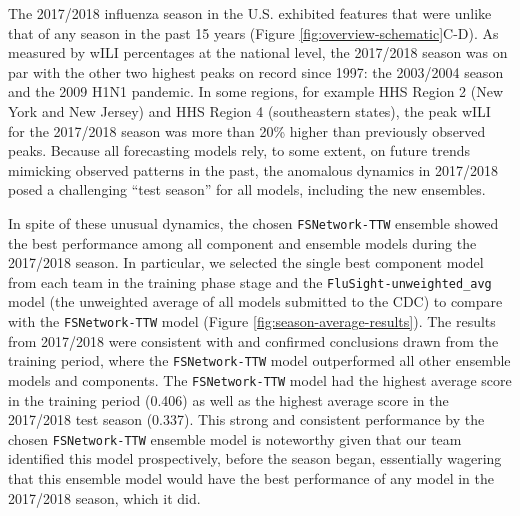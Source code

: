 \documentclass{article}\usepackage[]{graphicx}\usepackage[]{color}
\begin{document}
The 2017/2018 influenza season in the U.S. exhibited features that were unlike that of any season in the past 15 years (Figure \ref{fig:overview-schematic}C-D).
As measured by wILI percentages at the national level, the 2017/2018 season was on par with the other two highest peaks on record since 1997: the 2003/2004 season and the 2009 H1N1 pandemic.
In some regions, for example HHS Region 2 (New York and New Jersey) and HHS Region 4 (southeastern states), the peak wILI for the 2017/2018 season was more than 20\% higher than previously observed peaks.
Because all forecasting models rely, to some extent, on future trends mimicking observed patterns in the past, the anomalous dynamics in 2017/2018 posed a challenging ``test season'' for all models, including the new ensembles.

In spite of these unusual dynamics, the chosen {\tt FSNetwork-TTW} ensemble showed the best performance among all component and ensemble models during the 2017/2018 season.
In particular, we selected the single best component model from each team in the training phase stage and the {\tt FluSight-unweighted\_avg} model (the unweighted average of all models submitted to the CDC) to compare with the {\tt FSNetwork-TTW} model (Figure \ref{fig:season-average-results}).
The results from 2017/2018 were consistent with and confirmed conclusions drawn from the training period, where the {\tt FSNetwork-TTW} model outperformed all other ensemble models and components.
The {\tt FSNetwork-TTW} model had the highest average score in the training period 
(0.406) 
as well as the highest average score in the 2017/2018 test season 
(0.337).
This strong and consistent performance by the chosen {\tt FSNetwork-TTW} ensemble model is noteworthy given that our team identified this model prospectively, before the season began, essentially wagering that this ensemble model would have the best performance of any model in the 2017/2018 season, which it did.
\end{document}
